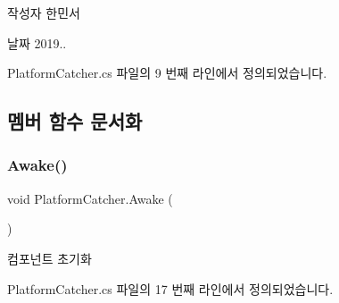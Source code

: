 \begin{DoxyAuthor}{작성자}
한민서 
\end{DoxyAuthor}
\begin{DoxyDate}{날짜}
2019.. 
\end{DoxyDate}


Platform\+Catcher.\+cs 파일의 9 번째 라인에서 정의되었습니다.



\subsection{멤버 함수 문서화}
\mbox{\label{class_platform_catcher_a85b586a2617a568e4201c3f3b3c4103f}} 
\subsubsection{\texorpdfstring{Awake()}{Awake()}}
{\footnotesize\ttfamily void Platform\+Catcher.\+Awake (\begin{DoxyParamCaption}{ }\end{DoxyParamCaption})\hspace{0.3cm}{\ttfamily [private]}}



컴포넌트 초기화 



Platform\+Catcher.\+cs 파일의 17 번째 라인에서 정의되었습니다.


